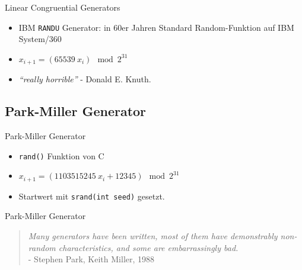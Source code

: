 \documentclass{beamer}
\begin{document}
\begin{frame}{Linear Congruential Generators}
	\begin{itemize}
		\item IBM \texttt{RANDU} Generator: in 60er Jahren Standard Random-Funktion auf IBM System/360
		\item $x_{i+1} = \left( 65539 \: x_i \right) \mod{2^{31}}$ 
		\item<4-> \textit{``really horrible''} - Donald E. Knuth.
	\end{itemize}
\end{frame}

\subsection{Park-Miller Generator}
\begin{frame}{Park-Miller Generator}

	\begin{itemize}
		\item \texttt{rand()} Funktion von C
		\item $x_{i+1} =  \left( 1103515245 \: x_i + 12345\right) \mod{2^{31}}$
		\item Startwert mit \texttt{srand(int seed)} gesetzt. 
	\end{itemize}
\end{frame}

\begin{frame}{Park-Miller Generator}
	\begin{quote}
		\textit{Many generators have been written, most of them have demonstrably non-random characteristics, and some are embarrassingly bad.} \\ - Stephen Park, Keith Miller, 1988
	\end{quote}	
\end{frame}
\end{document}
